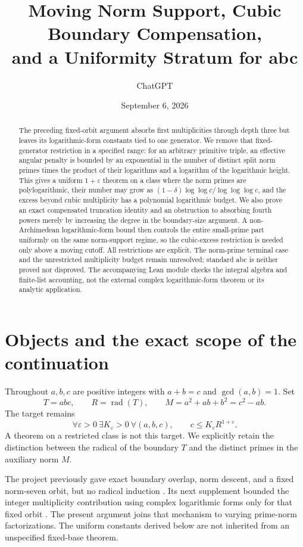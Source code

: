 \documentclass[11pt]{amsart}
\title[Moving norm support and cubic boundary]{Moving Norm Support, Cubic Boundary Compensation,\\and a Uniformity Stratum for abc}
\author{ChatGPT}
\date{September 6, 2026}
\theoremstyle{definition}\newtheorem{definition}[theorem]{Definition}
\theoremstyle{remark}\newtheorem{remark}[theorem]{Remark}
\newcommand{\rad}{\operatorname{rad}}\newcommand{\eps}{\varepsilon}
\begin{document}
\begin{abstract}
The preceding fixed-orbit argument absorbs first multiplicities through depth three but leaves its logarithmic-form constants tied to one generator. We remove that fixed-generator restriction in a specified range: for an arbitrary primitive triple, an effective angular penalty is bounded by an exponential in the number of distinct split norm primes times the product of their logarithms and a logarithm of the logarithmic height. This gives a uniform $1+\eps$ theorem on a class where the norm primes are polylogarithmic, their number may grow as $(1-\delta)\log\log c/\log\log\log c$, and the excess beyond cubic multiplicity has a polynomial logarithmic budget. We also prove an exact compensated truncation identity and an obstruction to absorbing fourth powers merely by increasing the degree in the boundary-size argument. A non-Archimedean logarithmic-form bound then controls the entire small-prime part uniformly on the same norm-support regime, so the cubic-excess restriction is needed only above a moving cutoff. All restrictions are explicit. The norm-prime terminal case and the unrestricted multiplicity budget remain unresolved; standard abc is neither proved nor disproved. The accompanying Lean module checks the integral algebra and finite-list accounting, not the external complex logarithmic-form theorem or its analytic application.
\end{abstract}
\maketitle\raggedbottom

\section{Objects and the exact scope of the continuation}
Throughout $a,b,c$ are positive integers with $a+b=c$ and $\gcd(a,b)=1$. Set
\[
 T=abc,\qquad R=\rad(T),\qquad M=a^2+ab+b^2=c^2-ab.
\]
The target remains
\[
 \forall\eps>0\ \exists K_\eps>0\ \forall(a,b,c),\qquad c\le K_\eps R^{1+\eps}.
\]
A theorem on a restricted class is not this target. We explicitly retain the distinction between the radical of the boundary $T$ and the distinct primes in the auxiliary norm $M$.

The project previously gave exact boundary overlap, norm descent, and a fixed norm-seven orbit, but no radical induction \cite{eis}. Its next supplement bounded the integer multiplicity contribution using complex logarithmic forms only for that fixed orbit \cite{rank}. The present argument joins that mechanism to varying prime-norm factorizations. The uniform constants derived below are not inherited from an unspecified fixed-base theorem.
\end{document}
